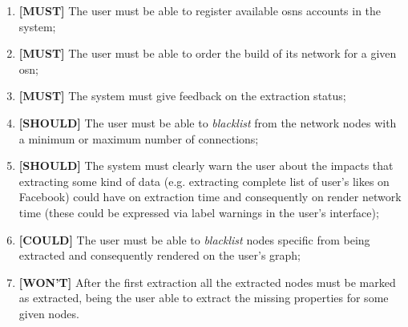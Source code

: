 \begin{enumerate}
    \item \textbf{[MUST]} The user must be able to register available \glspl{osn} accounts in the system;
    \item \textbf{[MUST]} The user must be able to order the build of its network for a given \gls{osn};
    \item \textbf{[MUST]} The system must give feedback on the extraction status;
    \item \textbf{[SHOULD]} The user must be able to \textit{blacklist} from the network nodes with a minimum or maximum number of connections;
    \item \textbf{[SHOULD]} The system must clearly warn the user about the impacts that extracting some kind of data (e.g. extracting complete list of user's likes on Facebook) could have on extraction time and consequently on render network time (these could be expressed via label warnings in the user's interface);
    \item \textbf{[COULD]} The user must be able to \textit{blacklist} nodes specific from being extracted and consequently rendered on the user's graph;
    \item \textbf{[WON'T]} After the first extraction all the extracted nodes must be marked as extracted, being the user able to extract the missing properties for some given nodes.
\end{enumerate}
